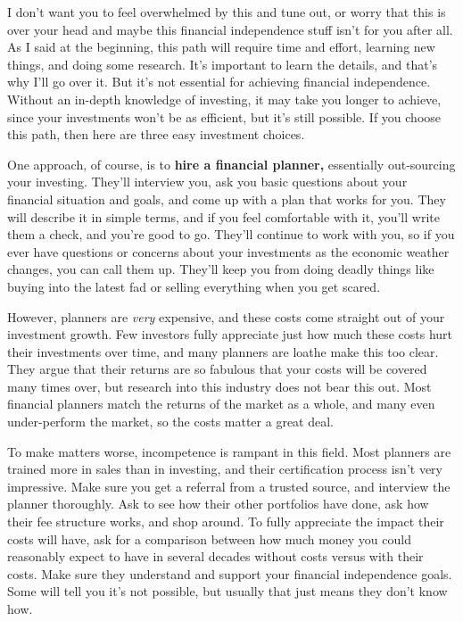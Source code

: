 I don't want you to feel overwhelmed by this and tune out, or worry that this is over your head and maybe this financial independence stuff isn't for you after all. As I said at the beginning, this path will require time and effort, learning new things, and doing some research. It's important to learn the details, and that's why I'll go over it. But it's not essential for achieving financial independence. Without an in-depth knowledge of investing, it may take you longer to achieve, since your investments won't be as efficient, but it's still possible. If you choose this path, then here are three easy investment choices.

One approach, of course, is to \textbf{hire a financial planner,} essentially out-sourcing your investing. They'll interview you, ask you basic questions about your financial situation and goals, and come up with a plan that works for you. They will describe it in simple terms, and if you feel comfortable with it, you'll write them a check, and you're good to go. They'll continue to work with you, so if you ever have questions or concerns about your investments as the economic weather changes, you can call them up. They'll keep you from doing deadly things like buying into the latest fad or selling everything when you get scared.

However, planners are \emph{very} expensive, and these costs come straight out of your investment growth. Few investors fully appreciate just how much these costs hurt their investments over time, and many planners are loathe make this too clear. They argue that their returns are so fabulous that your costs will be covered many times over, but research into this industry does not bear this out. Most financial planners match the returns of the market as a whole, and many even under-perform the market, so the costs matter a great deal.

To make matters worse, incompetence is rampant in this field. Most planners are trained more in sales than in investing, and their certification process isn't very impressive. Make sure you get a referral from a trusted source, and interview the planner thoroughly. Ask to see how their other portfolios have done, ask how their fee structure works, and shop around. To fully appreciate the impact their costs will have, ask for a comparison between how much money you could reasonably expect to have in several decades without costs versus with their costs. Make sure they understand and support your financial independence goals. Some will tell you it's not possible, but usually that just means they don't know how.

